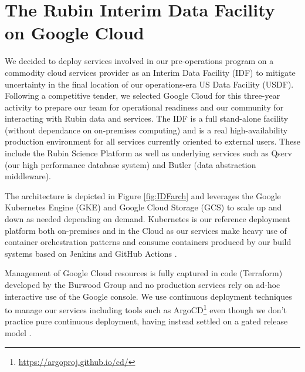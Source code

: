 \documentclass[11pt,twoside]{article}
\begin{document}
\section{The Rubin Interim Data Facility on Google Cloud}

We decided to deploy services involved in our pre-operations program on a commodity cloud services provider as an Interim Data Facility (IDF) to mitigate uncertainty in the final location of our operations-era US Data Facility (USDF).
Following a competitive tender, we selected Google Cloud for this three-year activity to prepare our team for operational readiness and our community for interacting with Rubin data and services.
The IDF is a full stand-alone facility (without dependance on on-premises computing) and is a real high-availability production environment for all services currently oriented to external users. These include the Rubin Science Platform as well as underlying services such as Qserv (our high performance database system) and Butler (data abstraction middleware).

The architecture is depicted in Figure \ref{fig:IDFarch} and leverages the Google Kubernetes Engine (GKE) and Google Cloud Storage (GCS) to scale up and down as needed depending on demand.
Kubernetes is our reference deployment platform both on-premises and in the Cloud as our services make heavy use of container orchestration patterns and consume containers produced by our build systems based on Jenkins and GitHub Actions \citep[see e.g.,][]{2018SPIE10707E..09J}.

Management of Google Cloud resources is fully captured in code (Terraform) developed by the Burwood Group and no production services rely on ad-hoc interactive use of the Google console. We use continuous deployment techniques to manage our services including tools such as ArgoCD\footnote{\url{https://argoproj.github.io/cd/}} even though we don't practice pure continuous deployment, having instead settled on a gated release model \citep{SQR-056}.

\end{document}
